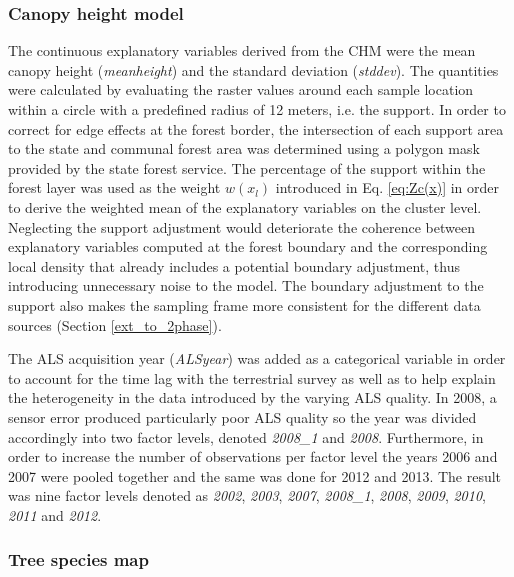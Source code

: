 \subsubsection{Canopy height model}

The continuous explanatory variables derived from the CHM were the mean canopy height (\textit{meanheight}) and the standard deviation (\textit{stddev}). The quantities were calculated by evaluating the raster values around each sample location within a circle with a predefined radius of 12 meters, i.e. the support. In order to correct for edge effects at the forest border, the intersection of each support area to the state and communal forest area was determined using a polygon mask provided by the state forest service. The percentage of the support within the forest layer was used as the weight $w(x_l)$ introduced in Eq. \ref{eq:Zc(x)} in order to derive the weighted mean of the explanatory variables on the cluster level. Neglecting the support adjustment would deteriorate the coherence between explanatory variables computed at the forest boundary and the corresponding local density that already includes a potential boundary adjustment, thus introducing unnecessary noise to the model. The boundary adjustment to the support also makes the sampling frame more consistent for the different data sources (Section \ref{ext_to_2phase}).\par
The ALS acquisition year (\textit{ALSyear}) was added as a categorical variable in order to account for the time lag with the terrestrial survey as well as to help explain the heterogeneity in the data introduced by the varying ALS quality. In 2008, a sensor error produced particularly poor ALS quality so the year was divided accordingly into two factor levels, denoted \textit{2008\_1} and \textit{2008}. Furthermore, in order to increase the number of observations per factor level the years 2006 and 2007 were pooled together and the same was done for 2012 and 2013.  The result was nine factor levels denoted as \textit{2002}, \textit{2003}, \textit{2007}, \textit{2008\_1}, \textit{2008}, \textit{2009}, \textit{2010}, \textit{2011} and \textit{2012}.

\subsubsection{Tree species map}

